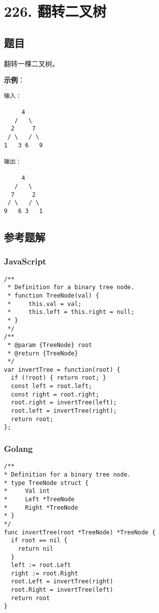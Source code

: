 \newpage
\section{226. 翻转二叉树}
\label{leetcode:226}

\subsection{题目}

翻转一棵二叉树。

\textbf{示例}：

\begin{verbatim}
输入：

     4
   /   \
  2     7
 / \   / \
1   3 6   9

输出：

     4
   /   \
  7     2
 / \   / \
9   6 3   1
\end{verbatim}

\subsection{参考题解}

\subsubsection{JavaScript}

\begin{verbatim}
/**
 * Definition for a binary tree node.
 * function TreeNode(val) {
 *     this.val = val;
 *     this.left = this.right = null;
 * }
 */
/**
 * @param {TreeNode} root
 * @return {TreeNode}
 */
var invertTree = function(root) {
  if (!root) { return root; }
  const left = root.left;
  const right = root.right;
  root.right = invertTree(left);
  root.left = invertTree(right);
  return root;
};
\end{verbatim}

\subsubsection{Golang}

\begin{verbatim}
/**
* Definition for a binary tree node.
* type TreeNode struct {
*     Val int
*     Left *TreeNode
*     Right *TreeNode
* }
*/
func invertTree(root *TreeNode) *TreeNode {
  if root == nil {
    return nil
  }
  left := root.Left
  right := root.Right
  root.Left = invertTree(right)
  root.Right = invertTree(left)
  return root
}
\end{verbatim}
